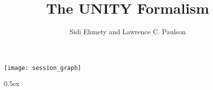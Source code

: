 \documentclass[10pt,a4paper,twoside]{article}
\begin{document}
\pagestyle{headings}

\title{The UNITY Formalism}
\author{Sidi Ehmety and Lawrence C. Paulson}
\maketitle

\tableofcontents

\begin{center}
  \texttt{[image: session\_graph]}
\end{center}

\newpage

\parindent 0pt\parskip 0.5ex


\end{document}
